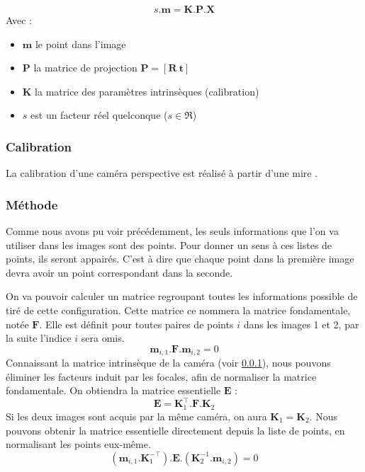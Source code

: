 \begin{equation}
s.\mathbf{m} = \mathbf{K}.\mathbf{P}.\mathbf{X}
\end{equation}
Avec : 
\begin{itemize}
\item $\mathbf{m}$ le point dans l'image
\item $\mathbf{P}$ la matrice de projection 
$\mathbf{P} = [ \mathbf{R} ~ \mathbf{t} ]$
\item $\mathbf{K}$ la matrice des paramètres intrinsèques (calibration)
\item $s$ est un facteur réel quelconque ($s \in \Re$)
\end{itemize}

\subsubsection{Calibration}
\label{subsub:calibration}
La calibration d'une caméra perspective est réalisé à partir d'une mire \cite{??}.

\subsubsection{Méthode}

Comme nous avons pu voir précédemment, les seuls informations que l'on va utiliser dans les images sont des points.
Pour donner un sens à ces listes de points, ils seront appairés.
C'est à dire que chaque point dans la première image devra avoir un point correspondant dans la seconde.

On va pouvoir calculer un matrice regroupant toutes les informations possible de tiré de cette configuration.
Cette matrice ce nommera la matrice fondamentale, notée $\mathbf{F}$.
Elle est définit pour toutes paires de points $i$ dans les images 1 et 2, par la suite l'indice $i$ sera omis.
\begin{equation}
\mathbf{m}_{i,1}.\mathbf{F}.\mathbf{m}_{i,2} = 0
\label{eq:fondamentale}
\end{equation}
Connaissant la matrice intrinsèque de la caméra (voir \ref{subsub:calibration}), nous pouvons éliminer les facteurs induit par les focales, afin de normaliser la matrice fondamentale.
On obtiendra la matrice essentielle $\mathbf{E}$ :
\begin{equation}
\mathbf{E} = \mathbf{K}_1^{\top} . \mathbf{F} . \mathbf{K}_2
\end{equation}
Si les deux images sont acquis par la même caméra, on aura $\mathbf{K}_1 = \mathbf{K}_2$.
Nous pouvons obtenir la matrice essentielle directement depuis la liste de points, en normalisant les points eux-même.
\begin{equation}
(\mathbf{m}_{i,1}.\mathbf{K}_1^{-\top}).\mathbf{E}.(\mathbf{K}_2^{-1}.\mathbf{m}_{i,2}) = 0
\label{eq:essentielle}
\end{equation}


